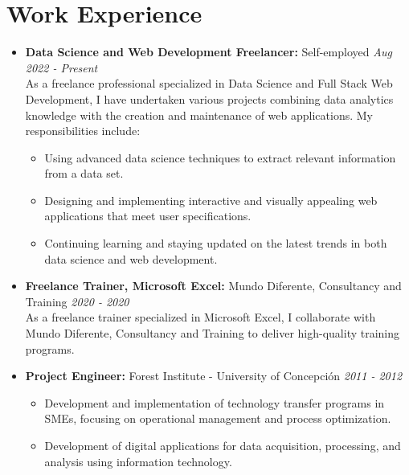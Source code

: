 \documentclass[a4paper,10pt]{article}
\begin{document}
	\section*{Work Experience}
	\begin{itemize}[left=0pt]
		\item \textbf{\large Data Science and Web Development Freelancer:} Self-employed \hfill \textit{Aug 2022 - Present} \\
		\small As a freelance professional specialized in Data Science and Full Stack Web Development, I have undertaken various projects combining data analytics knowledge with the creation and maintenance of web applications. My responsibilities include:
		\begin{itemize}[left=10pt]
			\item Using advanced data science techniques to extract relevant information from a data set.
			\item Designing and implementing interactive and visually appealing web applications that meet user specifications.
			\item Continuing learning and staying updated on the latest trends in both data science and web development.
		\end{itemize}
		
		\item \textbf{\large Freelance Trainer, Microsoft Excel:} Mundo Diferente, Consultancy and Training \hfill \textit{2020 - 2020} \\
		\small As a freelance trainer specialized in Microsoft Excel, I collaborate with Mundo Diferente, Consultancy and Training to deliver high-quality training programs.
		
		\item \textbf{\large Project Engineer:} Forest Institute - University of Concepción \hfill \textit{2011 - 2012}
		\begin{itemize}[left=10pt, topsep=0pt]
			\item Development and implementation of technology transfer programs in SMEs, focusing on operational management and process optimization.
			\item Development of digital applications for data acquisition, processing, and analysis using information technology.
		\end{itemize}
		

\end{itemize}
\end{document}
